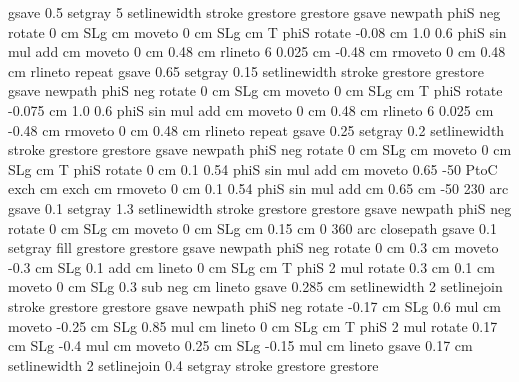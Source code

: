 {{    gsave
         0.5 setgray
                5 setlinewidth
         stroke
    grestore
   grestore
   gsave
     newpath
        phiS neg rotate
        0 cm SLg cm moveto
        0 cm SLg cm T
        phiS rotate
        -0.08 cm 1.0 0.6 phiS sin mul add cm moveto
        0 cm 0.48 cm rlineto
        6 { 0.025 cm -0.48 cm rmoveto
         0 cm 0.48 cm rlineto } repeat
    gsave
         0.65 setgray
                0.15 setlinewidth
         stroke
    grestore
   grestore
   gsave
     newpath
        phiS neg rotate
        0 cm SLg cm moveto
        0 cm SLg cm T
        phiS rotate
        -0.075 cm 1.0 0.6 phiS sin mul add cm moveto
        0 cm 0.48 cm rlineto
        6 { 0.025 cm -0.48 cm rmoveto
         0 cm 0.48 cm rlineto } repeat
    gsave
         0.25 setgray
                0.2 setlinewidth
         stroke
    grestore
   grestore
   gsave
     newpath
        phiS neg rotate
        0 cm SLg cm moveto
        0 cm SLg cm T
        phiS rotate
        0 cm 0.1 0.54 phiS sin mul add cm moveto
        0.65 -50 PtoC exch cm exch cm  rmoveto
        0 cm 0.1 0.54 phiS sin mul add cm  0.65 cm -50 230 arc
    gsave
         0.1 setgray
                1.3 setlinewidth
         stroke
    grestore
   grestore
   gsave
     newpath
        phiS neg rotate
        0 cm SLg cm moveto
        0 cm SLg cm  0.15 cm 0 360 arc
      closepath
    gsave
         0.1 setgray
         fill
    grestore
   grestore
   gsave
     newpath
     phiS neg rotate
       0 cm 0.3 cm moveto
       -0.3 cm SLg 0.1 add cm lineto
       0 cm SLg cm T
        phiS 2 mul rotate
       0.3 cm 0.1 cm moveto
       0 cm SLg 0.3 sub neg cm lineto
     gsave
       0.285 cm setlinewidth
       2 setlinejoin
       \pst@usecolor\PoCFillCol
        stroke
    grestore
   grestore
   gsave
     newpath
     phiS neg rotate
       -0.17 cm SLg 0.6 mul cm moveto
       -0.25 cm  SLg 0.85 mul cm lineto
       0 cm SLg cm T
        phiS 2 mul rotate
       0.17 cm SLg -0.4 mul cm moveto
       0.25 cm  SLg -0.15 mul cm lineto
     gsave
       0.17 cm setlinewidth
       2 setlinejoin
       0.4 setgray
        stroke
    grestore
   grestore
}}
